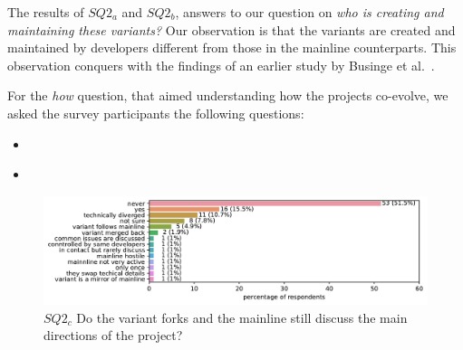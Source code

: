 The results of $SQ2_{a}$ and $SQ2_{b}$, answers to our question on \textit{who is creating and maintaining these variants?} Our observation is that the variants are created and maintained by developers different from those in the mainline counterparts. This observation conquers with the findings of an earlier study by Businge et al.~\cite{businge:emse:2021}.


For the \textit{how} question, that aimed understanding how the projects co-evolve, we asked the survey participants the following questions:
\begin{itemize}
\item \textbf{\rqTwoThree}
\item   \textbf{\rqTwoFour}
\end{itemize}


\begin{figure}[ht]
\begin{center}
    \centering
    \includegraphics[width=\columnwidth]{pdfs/discussions_rq3_colored.pdf}
    \caption{$SQ2_{c}$ Do the variant forks and the mainline still discuss the main directions of the project?}
    \label{fig:discussions}
\end{center}
\vspace{-.3cm}
\end{figure}

